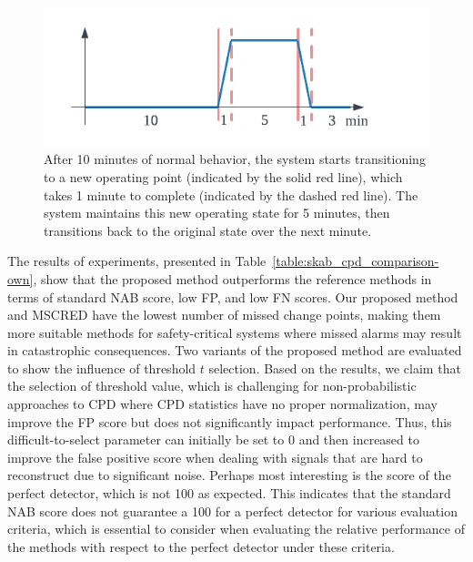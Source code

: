 \begin{figure}[H]
	\centering
	\includegraphics[width=\linewidth]{figures/scab-interpretation.pdf}
	\caption{After 10 minutes of normal behavior, the system starts transitioning to a new operating point (indicated by the solid red line), which takes 1 minute to complete (indicated by the dashed red line). The system maintains this new operating state for 5 minutes, then transitions back to the original state over the next minute.}\label{fig:scab_interpretation}
\end{figure}

The results of experiments, presented in Table~\ref{table:skab_cpd_comparison-own}, show that the proposed method outperforms the reference methods in terms of standard NAB score, low FP, and low FN scores. Our proposed method and MSCRED have the lowest number of missed change points, making them more suitable methods for safety-critical systems where missed alarms may result in catastrophic consequences. Two variants of the proposed method are evaluated to show the influence of threshold \(t\) selection. Based on the results, we claim that the selection of threshold value, which is challenging for non-probabilistic approaches to CPD where CPD statistics have no proper normalization, may improve the FP score but does not significantly impact performance. Thus, this difficult-to-select parameter can initially be set to 0 and then increased to improve the false positive score when dealing with signals that are hard to reconstruct due to significant noise. Perhaps most interesting is the score of the perfect detector, which is not 100 as expected. This indicates that the standard NAB score does not guarantee a 100 for a perfect detector for various evaluation criteria, which is essential to consider when evaluating the relative performance of the methods with respect to the perfect detector under these criteria.

